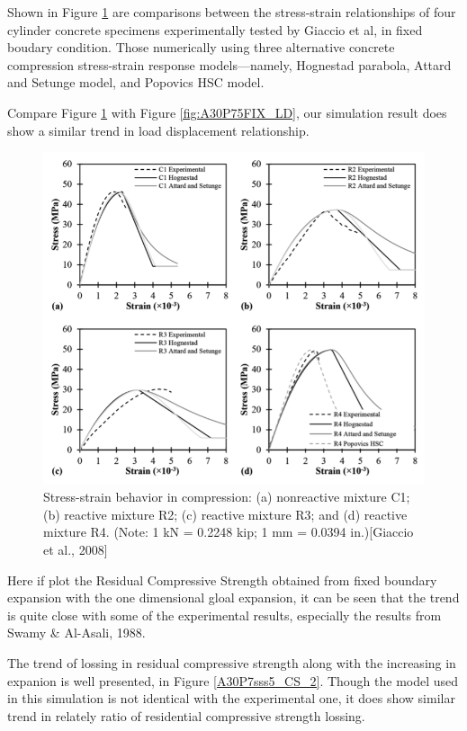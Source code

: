 Shown in Figure \ref{AncaLoadDisp} are comparisons between the stress-strain relationships of four cylinder concrete specimens experimentally tested by Giaccio et al\cite{Giaccio}, in fixed boudary condition. Those numerically using three alternative concrete compression stress-strain response models—namely, Hognestad parabola, Attard and Setunge model\cite{Attard}, and Popovics HSC model\cite{Thorenfeldt}.

Compare Figure \ref{AncaLoadDisp} with Figure \ref{fig:A30P75FIX_LD}, our simulation result does show a similar trend in load displacement relationship.

\begin{figure}[ht!]
\centering
\includegraphics[width=.8\linewidth]{Reference/AncaASR.png}
  \caption{Stress-strain behavior in compression: (a) nonreactive mixture C1; (b) reactive mixture R2; (c) reactive mixture R3; and (d) reactive mixture R4. (Note: 1 kN = 0.2248 kip; 1 mm = 0.0394 in.)[Giaccio et al., 2008]}
  \label{AncaLoadDisp}
\end{figure}

Here if plot the Residual Compressive Strength obtained from fixed boundary expansion with the one dimensional gloal expansion, it can be seen that the trend is quite close with some of the experimental results, especially the results from Swamy \& Al-Asali, 1988\cite{Swamy}.

The trend of lossing in residual compressive strength along with the increasing in expanion is well presented, in Figure \ref{A30P7sss5_CS_2}. Though the model used in this simulation is not identical with the experimental one, it does show similar trend in relately ratio of residential compressive strength lossing.

